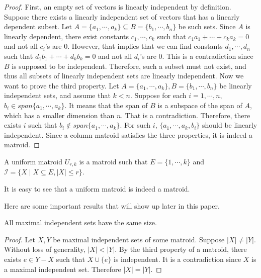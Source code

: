 \begin{proof}
First, an empty set of vectors is linearly independent by definition.
Suppose there exists a linearly independent set of vectors that has a linearly dependent subset.
Let $A = \{a_1, \cdots, a_k\} \subseteq B = \{b_1, \cdots, b_n\}$ be such sets.
Since $A$ is linearly dependent, there exist constants $c_1, \cdots, c_k$ such that $c_1 a_1 + \cdots + c_k a_k = 0$ and not all $c_i$'s are $0$.
However, that implies that we can find constants $d_1, \cdots, d_n$ such that $d_1 b_1 + \cdots + d_k b_k = 0$ and not all $d_i$'s are $0$.
This is a contradiction since $B$ is supposed to be independent.
Therefore, such a subset must not exist, and thus all subsets of linearly independent sets are linearly independent.
Now we want to prove the third property.
Let $A = \{a_1, \cdots, a_k\}, B = \{b_1, \cdots, b_n\}$ be linearly independent sets, and assume that $k < n$.
Suppose for each $i = 1, \cdots, n$, $b_i \in span\{ a_1, \cdots, a_k \}$.
It means that the span of $B$ is a subspace of the span of $A$, which has a smaller dimension than $n$.
That is a contradiction.
Therefore, there exists $i$ such that $b_i \notin span \{ a_1, \cdots, a_k \}$.
For such $i$, $\{ a_1, \cdots, a_k, b_i \}$ should be linearly independent.
Since a column matroid satisfies the three properties, it is indeed a matroid.
\end{proof}


\begin{defn}
A uniform matroid $U_{r, k}$ is a matroid such that $E = \{ 1, \cdots, k \}$ and $\mathcal{I} = \{ X \mid  X \subseteq E, \lvert X \rvert \leq r \}$.
\end{defn}

It is easy to see that a uniform matroid is indeed a matroid.


Here are some important results that will show up later in this paper.

\begin{thm}
All maximal independent sets have the same size.
\end{thm}

\begin{proof}
Let $X, Y$ be maximal independent sets of some matroid.
Suppose $\lvert X \rvert \neq \lvert Y \rvert$.
Without loss of generality, $\lvert X \rvert < \lvert Y \rvert$.
By the third property of a matroid, there exists $e \in Y - X$ such that $X \cup \{ e \}$ is independent.
It is a contradiction since $X$ is a maximal independent set.
Therefore $\lvert X \rvert = \lvert Y \rvert$.
\end{proof}

